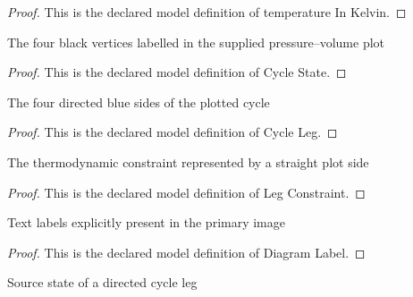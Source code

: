 \begin{proof}
  This is the declared model definition of temperature In Kelvin.
\end{proof}
\begin{definition}
  \label{def:physics:phyx-mini-0354:phyxminiproblems-problemphyxmini0354-cyclestate}
  The four black vertices labelled in the supplied pressure--volume plot
\end{definition}
\begin{proof}
  This is the declared model definition of Cycle State.
\end{proof}
\begin{definition}
  \label{def:physics:phyx-mini-0354:phyxminiproblems-problemphyxmini0354-cycleleg}
  The four directed blue sides of the plotted cycle
\end{definition}
\begin{proof}
  This is the declared model definition of Cycle Leg.
\end{proof}
\begin{definition}
  \label{def:physics:phyx-mini-0354:phyxminiproblems-problemphyxmini0354-legconstraint}
  The thermodynamic constraint represented by a straight plot side
\end{definition}
\begin{proof}
  This is the declared model definition of Leg Constraint.
\end{proof}
\begin{definition}
  \label{def:physics:phyx-mini-0354:phyxminiproblems-problemphyxmini0354-diagramlabel}
  Text labels explicitly present in the primary image
\end{definition}
\begin{proof}
  This is the declared model definition of Diagram Label.
\end{proof}
\begin{definition}
  \label{def:physics:phyx-mini-0354:phyxminiproblems-problemphyxmini0354-legsource}
  Source state of a directed cycle leg
\end{definition}
